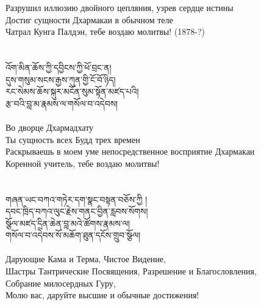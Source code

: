 Разрушил иллюзию двойного цепляния, узрев сердце истины \\
Достиг сущности Дхармакаи в обычном теле\\
Чатрал Кунга Палдэн, тебе воздаю молитвы! (1878-?)\\
\\
\\
\ti
འོག་མིན་ཆོས་ཀྱི་དབྱིངས་ཀྱི་ཕོ་བྲང་ན། \\
དུས་གསུམ་སངས་རྒྱས་ཀུན་གྱི་ངོ་བོ་ཉིད། \\
རང་སེམས་ཆོས་སྐུར་མངོན་སུམ་སྟོན་མཛད་པའི། \\
རྩ་བའི་བླ་མ་རྣམས་ལ་གསོལ་བ་འདེབས།\\
\\
\ru
Во дворце Дхармадхату\\
Ты сущность всех Будд трех времен\\
Раскрываешь в моем уме непосредственное восприятие Дхармакаи \\
Коренной учитель, тебе воздаю молитвы!\\
\\
\\
\ti
གཞན་ཡང་བཀའ་གཏེར་དག་སྣང་བསྟན་བཅོས་ཀྱི །\\
དབང་ཁྲིད་བཀའ་ལུང་རྗེས་གནང་བྱིན་རླབས་སོགས། \\
སྩོལ་མཛད་དྲིན་ཆེན་བླ་མའེ་ཚོགས་རྣམས་ལ། \\
གསོལ་བ་འདེབས་སོ་མཆོག་ཐུན་དངོས་གྲུབ་སྩོལ།\\
\\
\ru
Дарующие Кама и Терма, Чистое Видение, \\
Шастры Тантрические Посвящения, Разрешение и Благословления, \\
Собрание милосердных Гуру,\\
Молю вас, даруйте высшие и обычные достижения!\\
